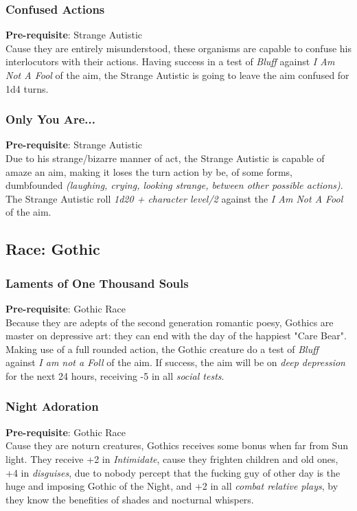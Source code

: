\documentclass[ letterpaper,12pt]{article}
\begin{document}
\subsubsection{Confused Actions}
{\bf Pre-requisite}: Strange Autistic\\
Cause they are entirely misunderstood, these organisms are capable to confuse his interlocutors with their actions. Having success in a test of {\it Bluff} against {\it I Am Not A Fool} of the aim, the Strange Autistic is going to leave the aim confused for 1d4 turns.

\subsubsection{Only You Are...}
 {\bf Pre-requisite}: Strange Autistic\\
Due to his strange/bizarre manner of act, the Strange Autistic is capable of amaze an aim, making it loses the turn action by be, of some forms, dumbfounded {\it (laughing, crying, looking strange, between other possible actions)}.  The Strange Autistic roll {\it 1d20 + character level/2} against the {\it I Am Not A Fool} of the aim.

\subsection{Race: Gothic}

\subsubsection{Laments of One Thousand Souls}
{\bf Pre-requisite}: Gothic Race\\
Because they are adepts of the second generation romantic poesy, Gothics are master on depressive art: they can end with the day of the happiest "Care Bear". Making use of a full rounded action, the Gothic creature do a test of {\it Bluff} against {\it I am not a Foll} of the aim. If success, the aim will be on {\it deep depression} for the next 24 hours, receiving -5 in all {\it social tests}.

\subsubsection{Night Adoration}
{\bf Pre-requisite}: Gothic Race\\
Cause they are noturn creatures, Gothics receives some bonus when far from Sun light.  They receive +2 in {\it Intimidate}, cause they frighten children and old ones, +4 in {\it disguises}, due to nobody percept that the fucking guy of other day is the huge and imposing Gothic of the Night, and +2 in all {\it combat relative plays}, by they know the benefities of shades and nocturnal whispers.\\
\end{document}
